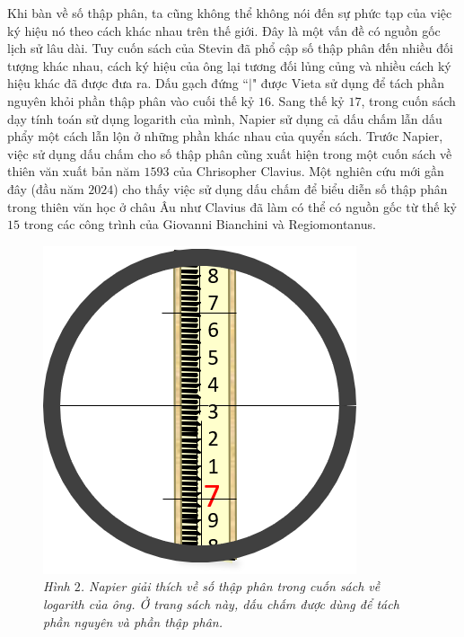 \begin{multicols}{2}
	\vskip 0.1cm
	Khi bàn về số thập phân, ta cũng không thể không nói đến sự phức tạp của việc ký hiệu nó theo cách khác nhau trên thế giới. Đây là một vấn đề có nguồn gốc lịch sử lâu dài. Tuy cuốn sách của Stevin đã phổ cập số thập phân đến nhiều đối tượng khác nhau, cách ký hiệu của ông lại tương đối lủng củng và nhiều cách ký hiệu khác đã được đưa ra. Dấu gạch đứng ``$\mid$" được Vieta sử dụng để tách phần nguyên khỏi phần thập phân vào cuối thế kỷ $16$. Sang thế kỷ $17$, trong cuốn sách dạy tính toán sử dụng logarith của mình, Napier sử dụng cả dấu chấm lẫn dấu phẩy một cách lẫn lộn ở những phần khác nhau của quyển sách. Trước Napier, việc sử dụng dấu chấm cho số thập phân cũng xuất hiện trong một cuốn sách về thiên văn xuất bản năm $1593$ của Chrisopher Clavius. Một nghiên cứu mới gần đây (đầu năm $2024$) cho thấy việc sử dụng dấu chấm để biểu diễn số thập phân trong thiên văn học ở châu Âu như Clavius đã làm có thể có nguồn gốc từ thế kỷ $15$ trong các công trình của Giovanni Bianchini và Regiomontanus. 
	\begin{figure}[H]
		\vspace*{-5pt}
		\centering
		\captionsetup{labelformat= empty, justification=centering}
		\includegraphics[width= 1\linewidth]{5}
		\caption{\small\textit{\color{toanhocdoisong}Hình $2$. Napier giải thích về số thập phân trong cuốn sách về logarith của ông. Ở trang sách này, dấu chấm được dùng để tách phần nguyên và phần thập phân.}}

\end{figure}
\end{multicols}
